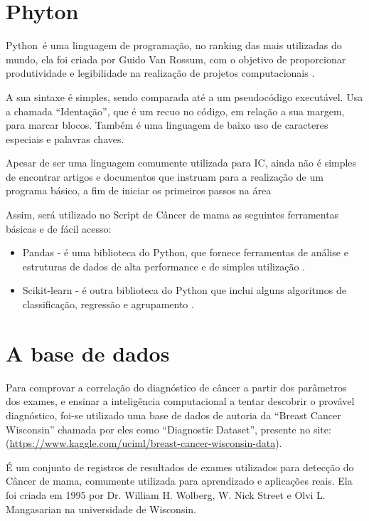 \section{\textbf{Phyton}}

Python é uma linguagem de programação, no ranking das mais utilizadas do mundo, ela foi criada por Guido Van Rossum,
com o objetivo de proporcionar produtividade e legibilidade na realização de projetos computacionais \cite{PYTHON}.

A sua sintaxe é simples, sendo comparada até a um pseudocódigo executável.
Usa a chamada “Identação”, que é um recuo no código, em relação a sua margem, para marcar blocos.
Também é uma linguagem de baixo uso de caracteres especiais e palavras chaves.

Apesar de ser uma linguagem comumente utilizada para IC,
ainda não é simples de encontrar artigos e documentos que instruam para a realização de um programa básico,
a fim de iniciar os primeiros passos na área

Assim, será utilizado no Script de Câncer de mama as seguintes ferramentas básicas e de fácil acesso:

\begin{itemize}
\item Pandas - é uma biblioteca do Python,
  que fornece ferramentas de análise e estruturas de dados de alta performance e de simples utilização \cite{PANDAS}.
\item Scikit-learn - é outra biblioteca do Python que inclui alguns algoritmos de classificação, regressão e agrupamento \cite{SCIKIT}.
\end{itemize}

\section{\textbf{A base de dados}}

Para comprovar a correlação do diagnóstico de câncer a partir dos parâmetros dos exames,
e ensinar a inteligência computacional a tentar descobrir o provável diagnóstico,
foi-se utilizado uma base de dados de autoria da “Breast Cancer Wisconsin” chamada por eles como “Diagnostic Dataset”, presente no site:
(\url{https://www.kaggle.com/uciml/breast-cancer-wisconsin-data})\cite{BREASTCANCER}.

É um conjunto de registros de resultados de exames utilizados para detecção do Câncer de mama,
comumente utilizada para aprendizado e aplicações reais.
Ela foi criada em 1995 por Dr. William H. Wolberg, W. Nick Street e Olvi L. Mangasarian na universidade de Wisconsin.

